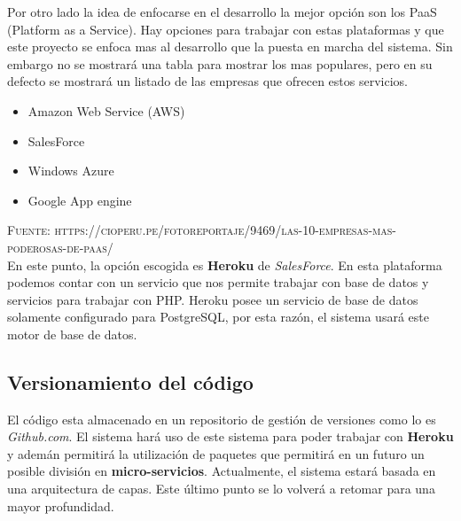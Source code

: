 Por otro lado la idea de enfocarse en el desarrollo la mejor opción son los PaaS (Platform as a Service). Hay opciones para trabajar con estas plataformas y que este proyecto se enfoca mas al desarrollo que la puesta en marcha del sistema. Sin embargo no se mostrará una tabla para mostrar los mas populares, pero en su defecto se mostrará un listado de las empresas que ofrecen estos servicios.

\begin{itemize}
\item Amazon Web Service (AWS)
\item SalesForce
\item Windows Azure
\item Google App engine
\end{itemize}
\textsc{Fuente: https://cioperu.pe/fotoreportaje/9469/las-10-empresas-mas-poderosas-de-paas/}\\

En este punto, la opción escogida es \textbf{Heroku} de \textit{SalesForce}. En esta plataforma podemos contar con un servicio que nos permite trabajar con base de datos y servicios para trabajar con PHP. Heroku posee un servicio de base de datos solamente configurado para PostgreSQL, por esta razón, el sistema usará este motor de base de datos.

\subsection{Versionamiento del código}

El código esta almacenado en un repositorio de gestión de versiones como lo es \textit{Github.com}. El sistema hará uso de este sistema para poder trabajar con \textbf{Heroku} y ademán permitirá la utilización de paquetes que permitirá en un futuro un posible división en \textbf{micro-servicios}. Actualmente, el sistema estará basada en una arquitectura de capas. Este último punto se lo volverá a retomar para una mayor profundidad.\\


